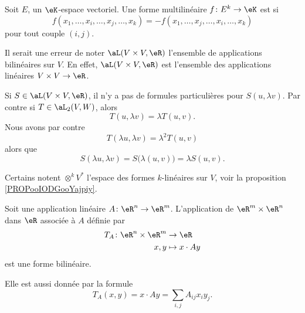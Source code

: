 \begin{definition}	\label{DEFooZFCKooGIoYrE}
	Soit \( E\), un \( \eK\)-espace vectoriel. Une forme multilinéaire \(f \colon E^k\to \eK  \) est  si
	\begin{equation}
		f(x_1,\ldots,x_i,\ldots,x_j,\ldots,x_k)=-f(x_1,\ldots,x_j,\ldots,x_i,\ldots,x_k)
	\end{equation}
	pour tout couple \( (i,j)\).
\end{definition}

\begin{normaltext}
	Il serait une erreur de noter \( \aL(V\times V,\eR)\) l'ensemble de applications bilinéaires sur \( V\). En effet, \( \aL(V\times V,\eR)\) est l'ensemble des applications linéaires \( V\times V\to \eR\).

	Si \( S\in \aL(V\times V,\eR)\), il n'y a pas de formules particulières pour \( S(u,\lambda v)\). Par contre si \( T\in\aL_2(V,W)\), alors
	\begin{equation}
		T(u,\lambda v)=\lambda T(u,v).
	\end{equation}
	Nous avons par contre
	\begin{equation}
		T(\lambda u,\lambda v)=\lambda^2 T(u,v)
	\end{equation}
	alors que
	\begin{equation}
		S(\lambda u,\lambda v)=  S\big( \lambda(u,v) \big) =\lambda S(u,v).
	\end{equation}

	Certains\cite{BIBooDEEYooRGFyDD} notent \( \otimes^kV^*\) l'espace des formes \( k\)-linéaires sur \( V\), voir la proposition \ref{PROPooIODGooYajpiy}.
\end{normaltext}


\begin{example}
	Soit une application linéaire \(A \colon \eR^n\to \eR^m  \). L'application de \( \eR^m\times \eR^n\) dans \( \eR\) associée à \( A\) définie par
	\begin{equation}
		\begin{aligned}
			T_A\colon \eR^n\times \eR^m & \to \eR           \\
			x,y                         & \mapsto x\cdot Ay
		\end{aligned}
	\end{equation}
	est une forme bilinéaire.

	Elle est aussi donnée par la formule
	\begin{equation}
		T_A(x,y)= x\cdot Ay =\sum_{i,j}A_{ij}x_i y_j.
	\end{equation}
\end{example}
